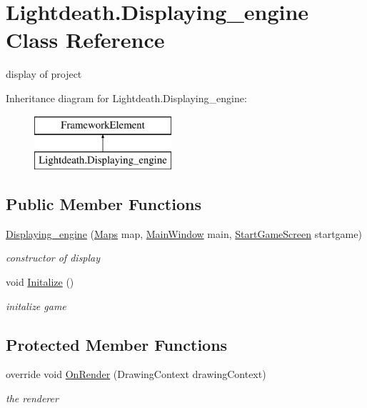\hypertarget{class_lightdeath_1_1_displaying__engine}{}\section{Lightdeath.\+Displaying\+\_\+engine Class Reference}
\label{class_lightdeath_1_1_displaying__engine}


display of project  


Inheritance diagram for Lightdeath.\+Displaying\+\_\+engine\+:\begin{figure}[H]
\begin{center}
\leavevmode
\includegraphics[height=2.000000cm]{class_lightdeath_1_1_displaying__engine}
\end{center}
\end{figure}
\subsection*{Public Member Functions}
\begin{DoxyCompactItemize}
\item 
\hyperlink{class_lightdeath_1_1_displaying__engine_adfb7ade67964f42515d3dcee36ba8b31}{Displaying\+\_\+engine} (\hyperlink{class_lightdeath_1_1_maps}{Maps} map, \hyperlink{class_lightdeath_1_1_main_window}{Main\+Window} main, \hyperlink{class_lightdeath_1_1_start_game_screen}{Start\+Game\+Screen} startgame)
\begin{DoxyCompactList}\small\item\em constructor of display \end{DoxyCompactList}\item 
void \hyperlink{class_lightdeath_1_1_displaying__engine_a46c379758467d5d5ff48bdab0063cc33}{Initalize} ()
\begin{DoxyCompactList}\small\item\em initalize game \end{DoxyCompactList}\end{DoxyCompactItemize}
\subsection*{Protected Member Functions}
\begin{DoxyCompactItemize}
\item 
override void \hyperlink{class_lightdeath_1_1_displaying__engine_aa548fa23a8cdadec8d6b4a2e31192d5f}{On\+Render} (Drawing\+Context drawing\+Context)
\begin{DoxyCompactList}\small\item\em the renderer \end{DoxyCompactList}\end{DoxyCompactItemize}
